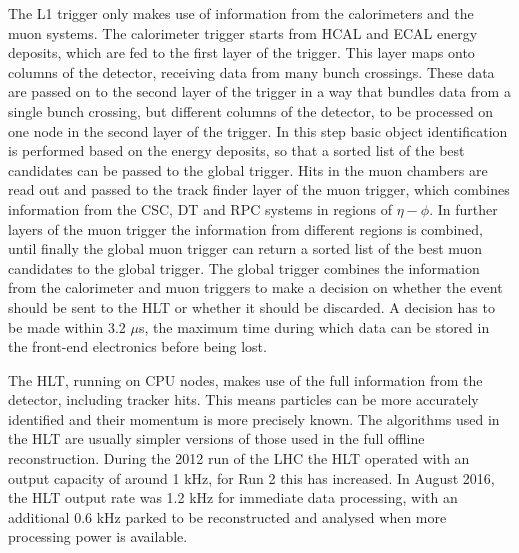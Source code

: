 The \ac{L1} trigger only makes use of information from the calorimeters and the muon systems.
The calorimeter trigger starts from \ac{HCAL} and \ac{ECAL} energy deposits, 
which are fed to the first layer of the trigger. This layer maps onto
columns of the detector, receiving data from many bunch crossings. These data are passed
on to the second layer of the trigger in a way that bundles data from a single bunch crossing, but
different columns of the detector, to be processed on one node in the second layer of the
trigger. In this step basic object identification is performed based on the energy
deposits, so that a sorted list of the best candidates can be passed to the global trigger.
Hits in the muon chambers are read out and passed to the track finder layer 
of the muon trigger, which combines information from the CSC, \ac{DT}
and RPC systems in regions of $\eta-\phi$.
In further layers of the muon trigger the information from different
regions is combined, until finally the global muon trigger
can return a sorted list of the best muon candidates to the global trigger.
The global trigger combines the information from the calorimeter and muon triggers
to make a decision on whether the event should be sent to the \ac{HLT} or whether
it should be discarded. A decision has to be made within 3.2 $\mu$s, the maximum time during
which data can be stored in the front-end electronics before being lost.


The \ac{HLT}, running on CPU nodes, makes use of the full information
from the detector, including tracker hits. This means particles
can be more accurately identified and their momentum is more
precisely known. The algorithms used in the \ac{HLT} are usually simpler
versions of those used in the full offline reconstruction. %
During the 2012 run of the \ac{LHC} the \ac{HLT} operated with an output
capacity of around 1 kHz, for Run 2 this has increased. In August 2016, 
the \ac{HLT} output rate was 1.2 kHz for immediate data processing, with
an additional 0.6 kHz parked to be reconstructed and analysed when 
more processing power is available\cite{CMS-PAS-HIG-16-037}. %

